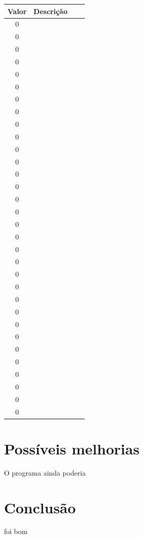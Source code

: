 \documentclass[a4paper,titlepage,11pt]{article}
\begin{document}
\begin{center}
	\begin{tabular}{cccc}
		\hline
		Valor & Descrição \\
		\hline
		0 &  \\
		0 &  \\
		0 &  \\
		0 &  \\
		0 &  \\
		0 &  \\
		0 &  \\
		0 &  \\
		0 &  \\
		0 &  \\
		0 &  \\
		0 &  \\
		0 &  \\
		0 &  \\
		0 &  \\
		0 &  \\
		0 &  \\
		0 &  \\
		0 &  \\
		0 &  \\
		0 &  \\
		0 &  \\
		0 &  \\
		0 &  \\
		0 &  \\
		0 &  \\
		0 &  \\
		0 &  \\
		0 &  \\
		0 &  \\
		0 &  \\
		0 &  \\
		\hline
	\end{tabular}
\end{center}

\section{Possíveis melhorias}
O programa ainda poderia

\enlargethispage{.5cm}
\section{Conclusão}
foi bom
\end{document}
